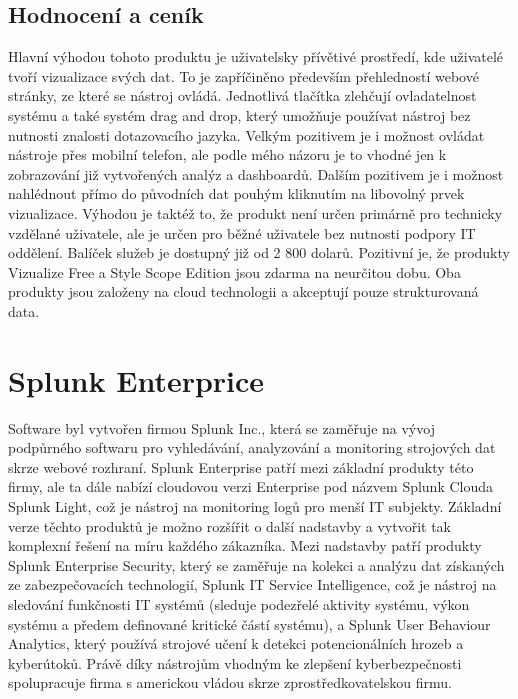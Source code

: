 \documentclass[czech,BP]{thesiskiv}
\begin{document}
\subsection{Hodnocení a ceník}
Hlavní výhodou tohoto produktu je uživatelsky přívětivé prostředí, kde uživatelé tvoří vizualizace svých dat. To je zapříčiněno především přehledností webové stránky, ze které se nástroj ovládá. Jednotlivá tlačítka zlehčují ovladatelnost systému a také systém drag and drop, který umožňuje používat nástroj bez nutnosti znalosti dotazovacího jazyka. Velkým pozitivem je i možnost ovládat nástroje přes mobilní telefon, ale podle mého názoru je to vhodné jen k zobrazování již vytvořených analýz a dashboardů. Dalším pozitivem je i možnost nahlédnout přímo do původních dat pouhým kliknutím na libovolný prvek vizualizace. Výhodou je taktéž to, že produkt není určen primárně pro technicky vzdělané uživatele, ale je určen pro běžné uživatele bez nutnosti podpory IT oddělení. Balíček služeb je dostupný již od 2 800 dolarů.\cite{InetCenik} Pozitivní je, že produkty Vizualize Free a Style Scope Edition jsou zdarma na neurčitou dobu. Oba produkty jsou založeny na cloud technologii a akceptují pouze strukturovaná data.



\section{Splunk Enterprice}
Software byl vytvořen firmou Splunk Inc., která se zaměřuje na vývoj podpůrného softwaru pro vyhledávání, analyzování a monitoring strojových dat skrze webové rozhraní.\cite{Splunk_a_kompatibilita} Splunk Enterprise patří mezi základní produkty této firmy, ale ta dále nabízí cloudovou verzi Enterprise pod názvem Splunk Cloud\texttrademark a Splunk Light, což je nástroj na monitoring logů pro menší IT subjekty. Základní verze těchto produktů je možno rozšířit o další nadstavby a vytvořit tak komplexní řešení na míru každého zákazníka. Mezi nadstavby patří produkty Splunk Enterprise Security, který se zaměřuje na kolekci a analýzu dat získaných ze zabezpečovacích technologií, Splunk IT Service Intelligence, což je nástroj na sledování funkčnosti IT systémů (sleduje podezřelé aktivity systému, výkon systému a předem definované kritické částí systému), a Splunk User Behaviour Analytics, který používá strojové učení k detekci potencionálních hrozeb a kyberútoků. Právě díky nástrojům vhodným ke zlepšení kyberbezpečnosti spolupracuje firma s americkou vládou skrze zprostředkovatelskou firmu.\cite{Splunk_security}
\end{document}
